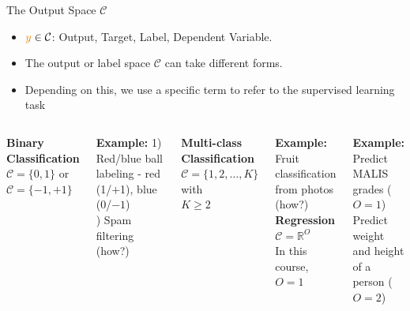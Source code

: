 \documentclass[aspectratio=169,10pt]{beamer}
\begin{document}

%	
%	

\begin{frame}[t]{The Output Space $\mathcal{C}$}
	\begin{itemize}
		\item $\smally \in \mathcal{C}$: Output, Target, Label, Dependent Variable.
		\item The output or label space $\mathcal{C}$ can take different forms. 
		\item Depending on this, we use a specific term to refer to the supervised learning task
	\end{itemize}

	\vspace{0.5cm}
	\begin{columns}[t]
		\pause
		\textbf{Binary Classification}\\
		$\mathcal{C} = \lbrace 0, 1 \rbrace $ or \\
		$\mathcal{C} = \lbrace -1, +1 \rbrace $
		
		\pause
		\vspace{0.7cm}
		\alert{\textbf{Example:}} 1) Red/blue ball labeling - red (1/$+$1), blue (0/$-1$)\\
		) Spam filtering (how?)
	
		\pause
		\textbf{Multi-class Classification}\\
		$\mathcal{C} = \lbrace 1, 2, \ldots, K \rbrace$ with \\
		$K \geq 2$
		
		\vspace{0.7cm}
		\alert{\textbf{Example:}} Fruit classification from photos\\
		(how?)
		\pause
		\textbf{Regression}\\
		$\mathcal{C} = \mathbb{R}^O$ \\
		In this course, $O=1$
		
		\vspace{0.7cm}
		\alert{\textbf{Example:}} Predict MALIS grades ($O=1$) \\
		\pause
		Predict weight and height of a person ($O=2$)
	\end{columns}
\end{frame}
\end{document}
